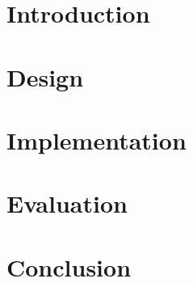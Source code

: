 \documentclass[11pt,a4paper,draft]{report}
\author{Hermann Loose}
\begin{document}
\begin{titlepage}

\maketitle

%
%
%
\end{titlepage}

\tableofcontents

\newpage

\listoftodos

\newpage

\chapter{Introduction}







\chapter{Design}



\chapter{Implementation}





\chapter{Evaluation}



\chapter{Conclusion}



\appendix



\end{document}
